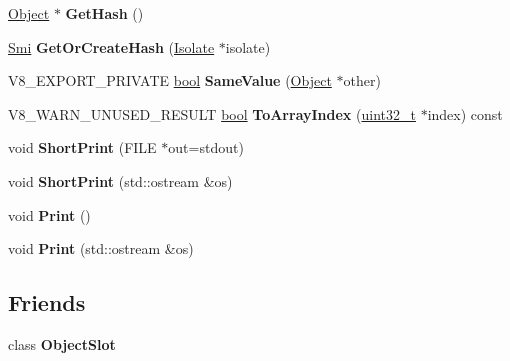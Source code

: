 \begin{DoxyCompactItemize}
\mbox{\label{classv8_1_1internal_1_1ObjectPtr_a75d823e29f053a26a64d9926c67798b7}} 
\mbox{\hyperlink{classv8_1_1internal_1_1Object}{Object}} $\ast$ {\bfseries Get\+Hash} ()
\item 
\mbox{\label{classv8_1_1internal_1_1ObjectPtr_abf1c4f9732b82c94f578e037e8b7e752}} 
\mbox{\hyperlink{classv8_1_1internal_1_1Smi}{Smi}} {\bfseries Get\+Or\+Create\+Hash} (\mbox{\hyperlink{classv8_1_1internal_1_1Isolate}{Isolate}} $\ast$isolate)
\item 
\mbox{\label{classv8_1_1internal_1_1ObjectPtr_a0cafae0cae0653673ddf7940c1000415}} 
V8\+\_\+\+E\+X\+P\+O\+R\+T\+\_\+\+P\+R\+I\+V\+A\+TE \mbox{\hyperlink{classbool}{bool}} {\bfseries Same\+Value} (\mbox{\hyperlink{classv8_1_1internal_1_1Object}{Object}} $\ast$other)
\item 
\mbox{\label{classv8_1_1internal_1_1ObjectPtr_a16cc4add224deae0b846a51791c6ad3e}} 
V8\+\_\+\+W\+A\+R\+N\+\_\+\+U\+N\+U\+S\+E\+D\+\_\+\+R\+E\+S\+U\+LT \mbox{\hyperlink{classbool}{bool}} {\bfseries To\+Array\+Index} (\mbox{\hyperlink{classuint32__t}{uint32\+\_\+t}} $\ast$index) const
\item 
\mbox{\label{classv8_1_1internal_1_1ObjectPtr_a6c1091016657c1c909a9b09b6e1392a0}} 
void {\bfseries Short\+Print} (F\+I\+LE $\ast$out=stdout)
\item 
\mbox{\label{classv8_1_1internal_1_1ObjectPtr_ab27dec9ecc0ce332e4920a7a241fe153}} 
void {\bfseries Short\+Print} (std\+::ostream \&os)
\item 
\mbox{\label{classv8_1_1internal_1_1ObjectPtr_af45a17b36e926c5d6a60c6c6f2805508}} 
void {\bfseries Print} ()
\item 
\mbox{\label{classv8_1_1internal_1_1ObjectPtr_ab2e1315fc7c62ae0ee6975daa607f671}} 
void {\bfseries Print} (std\+::ostream \&os)
\end{DoxyCompactItemize}
\subsection*{Friends}
\begin{DoxyCompactItemize}
\item 
\mbox{\label{classv8_1_1internal_1_1ObjectPtr_abe1c10a7791e5c6df3c295dc89195195}} 
class {\bfseries Object\+Slot}
\end{DoxyCompactItemize}


